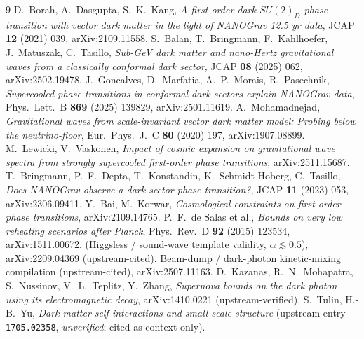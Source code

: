 \documentclass[11pt]{article}
\begin{document}
\begin{thebibliography}{9}
 D.~Borah, A.~Dasgupta, S.~K.~Kang,
\textit{A first order dark $SU(2)_D$ phase transition with vector dark matter in the light of NANOGrav
12.5 yr data}, JCAP \textbf{12} (2021) 039, arXiv:2109.11558.
 S.~Balan, T.~Bringmann, F.~Kahlhoefer, J.~Matuszak, C.~Tasillo,
\textit{Sub-GeV dark matter and nano-Hertz gravitational waves from a classically conformal dark
sector}, JCAP \textbf{08} (2025) 062, arXiv:2502.19478.
 J.~Goncalves, D.~Marfatia, A.~P.~Morais, R.~Pasechnik,
\textit{Supercooled phase transitions in conformal dark sectors explain NANOGrav data}, Phys.\ Lett.\
B \textbf{869} (2025) 139829, arXiv:2501.11619.
 A.~Mohamadnejad,
\textit{Gravitational waves from scale-invariant vector dark matter model: Probing below the
neutrino-floor}, Eur.\ Phys.\ J.\ C \textbf{80} (2020) 197, arXiv:1907.08899.
\bibitem{LewickiVaskonen2025} M.~Lewicki, V.~Vaskonen,
\textit{Impact of cosmic expansion on gravitational wave spectra from strongly supercooled first-order
phase transitions}, arXiv:2511.15687.
 T.~Bringmann, P.~F.~Depta, T.~Konstandin, K.~Schmidt-Hoberg, C.~Tasillo,
\textit{Does NANOGrav observe a dark sector phase transition?}, JCAP \textbf{11} (2023) 053,
arXiv:2306.09411.
 Y.~Bai, M.~Korwar,
\textit{Cosmological constraints on first-order phase transitions}, arXiv:2109.14765.
\bibitem{deSalas2015} P.~F.~de Salas et al.,
\textit{Bounds on very low reheating scenarios after Planck}, Phys.\ Rev.\ D \textbf{92} (2015)
123534, arXiv:1511.00672.
 (Higgsless / sound-wave template validity, $\alpha\lesssim0.5$),
arXiv:2209.04369 (upstream-cited).
 Beam-dump / dark-photon kinetic-mixing compilation (upstream-cited),
arXiv:2507.11163.
 D.~Kazanas, R.~N.~Mohapatra, S.~Nussinov, V.~L.~Teplitz, Y.~Zhang,
\textit{Supernova bounds on the dark photon using its electromagnetic decay}, arXiv:1410.0221
(upstream-verified).
 S.~Tulin, H.-B.~Yu,
\textit{Dark matter self-interactions and small scale structure} (upstream entry \texttt{1705.02358},
\emph{unverified}; cited as context only).
\end{thebibliography}
\end{document}
